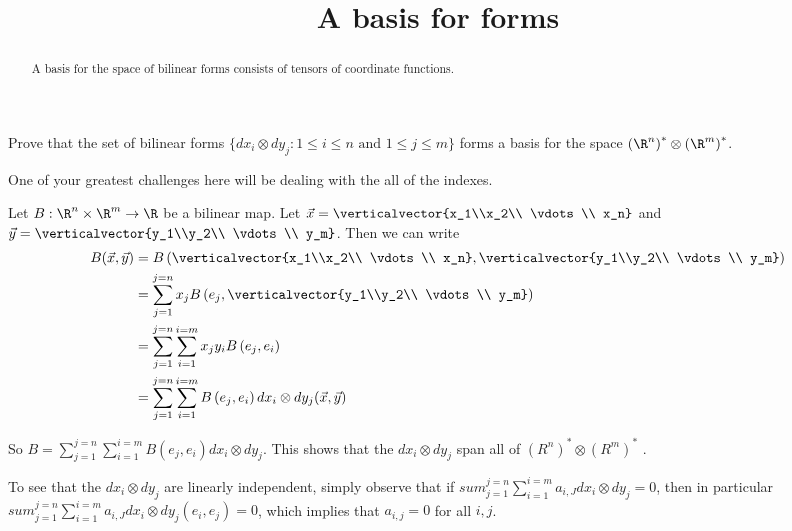 \documentclass{ximera}
\title{A basis for forms}
\begin{document}
\begin{abstract}
  A basis for the space of bilinear forms consists of tensors of coordinate functions.
\end{abstract}	

Prove that the set of bilinear forms $\{ dx_i \otimes dy_j : 1 \leq i \leq n \text{ and } 1\leq j \leq m\}$ forms a basis for the space 
$\left(\R^n\right)^* \otimes \left(\R^m\right)^*$.

\begin{warning}
  One of your greatest challenges here will be dealing with the all of the indexes.
\end{warning}
	
\begin{free-response}
  Let $B:\R^n \times \R^m \to \R$ be a bilinear map.  Let $\vec{x} = \verticalvector{x_1\\x_2\\ \vdots \\ x_n}$ and 
  $\vec{y} = \verticalvector{y_1\\y_2\\ \vdots \\ y_m}$. Then we can write
  \begin{align*}
    B(\vec{x},\vec{y})&=
    B\left( \verticalvector{x_1\\x_2\\ \vdots \\ x_n}, \verticalvector{y_1\\y_2\\ \vdots \\ y_m}\right) \\
    &= \sum_{j=1}^{j=n} x_jB\left( e_j, \verticalvector{y_1\\y_2\\ \vdots \\ y_m}\right)\\
    &= \sum_{j=1}^{j=n} \sum_{i=1}^{i=m} x_jy_i B\left( e_j , e_i\right)\\
    &= \sum_{j=1}^{j=n} \sum_{i=1}^{i=m} B\left( e_j,e_i\right) dx_i \otimes dy_j(\vec{x},\vec{y})
  \end{align*}
  
  So $B = \sum_{j=1}^{j=n} \sum_{i=1}^{i=m} B\left( e_j,e_i\right) dx_i \otimes dy_j$.  This shows that the $dx_i \otimes dy_j$ span all of 
  $\left(R^n\right)^* \otimes \left(R^m\right)^*$ .
  
  To see that the $dx_i \otimes dy_j$ are linearly independent, simply observe that if 
  $sum_{j=1}^{j=n} \sum_{i=1}^{i=m} a_{i,J} dx_i \otimes dy_j = 0$, then in particular
  $sum_{j=1}^{j=n} \sum_{i=1}^{i=m} a_{i,J} dx_i \otimes dy_j (e_i,e_j)= 0$, which implies that
  $a_{i,j} = 0$ for all $i,j$.
\end{free-response}
\end{document}
